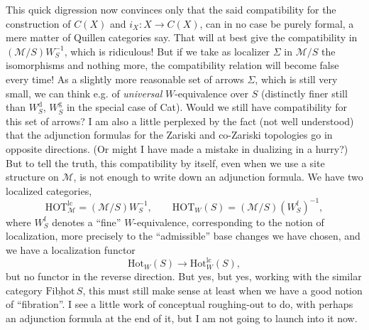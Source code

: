 \documentclass[11pt]{article}
\newcommand{\msp}[1]{\marginpar{\footnotesize [#1]}}
\newcommand{\usl}[1]{\underline{\mathrm{#1}}}
\begin{document}
This quick digression now convinces only that the said compatibility for the construction of $C(X)$ and $i_X : X \longrightarrow C(X)$, can in no case be purely formal, a mere matter of Quillen categories say. That will at best give the compatibility in $(\mathcal{M}/S)W_S^{-1}$, which is ridiculous! But if we take as localizer $\Sigma$ in $\mathcal{M}/S$ the isomorphisms and nothing more, the compatibility relation will become false every time! As a slightly more reasonable set of arrows $\Sigma$, which is still very small, we can think e.g. of \textit{universal} $W$-equivalence over $S$ (distinctly finer still than $W_S^{\mathrm{d}}$, $W_S^{\mathrm{g}}$ in the special case of Cat). Would we still have compatibility for this set of arrows? I am also a little perplexed by the fact (not well understood) that the adjunction formulas for the Zariski and co-Zariski topologies go in opposite directions. (Or might I have made a mistake in dualizing in a hurry?) But to tell the truth, this compatibility by itself, even when we use a site structure on $\mathcal{M}$, is not enough to write down an adjunction formula. We have two localized categories, %
\[
\mathrm{HOT}^{\mathrm{lc}}_{\mathcal{M}} = (\mathcal{M}/S)W_S^{-1}, \qquad \mathrm{HOT}_W(S) = (\mathcal{M}/S)(W_S^{\mathrm{f}})^{-1},
\]
where $W_S^{\mathrm{f}}$ denotes a ``fine'' $W$-equivalence, corresponding to the notion of localization, more precisely to the ``admissible'' base changes we have chosen, and we have a localization functor
\msp{page 85}
\[
\mathrm{Hot}_W(S) \longrightarrow \mathrm{Hot}^{\mathrm{lc}}_{W}(S),
\]
but no functor in the reverse direction. But yes, but yes, working with the similar category $\usl{Fibhot}\,S$, this must still make sense at least when we have a good notion of ``fibration''. I see a little work of conceptual roughing-out to do, with perhaps an adjunction formula at the end of it, but I am not going to launch into it now.
\end{document}
